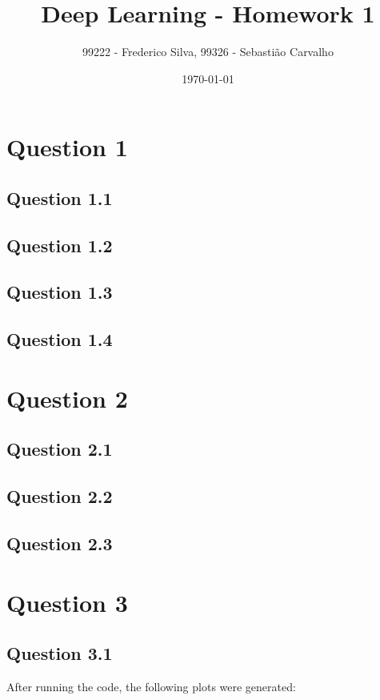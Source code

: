 \documentclass{article}
\title{Deep Learning - Homework 1}
\author{99222 - Frederico Silva, 99326 - Sebastião Carvalho}
\date{\today}
\begin{document}
\maketitle

\tableofcontents

\section{Question 1}

\subsection{Question 1.1}

\subsection{Question 1.2}

\subsection{Question 1.3}

\subsection{Question 1.4}

\section{Question 2}

\subsection{Question 2.1}

\subsection{Question 2.2}

\subsection{Question 2.3}

\section{Question 3}

\subsection{Question 3.1}
After running the code, the following plots were generated:
\end{document}
